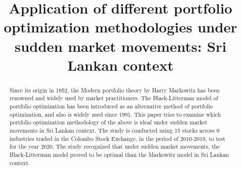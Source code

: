 \documentclass[conference]{IEEEtran}
\begin{document}
\title{Application of different portfolio optimization methodologies under sudden market movements: Sri Lankan context\\
}
\author{

\and
{}

\and
{}

\and
{}
}

\maketitle

\begin{abstract}

Since its origin in 1952, the Modern portfolio theory by Harry Markowitz has been renowned and widely used by market practitioners. The Black-Litterman model of portfolio optimization has been introduced as an alternative method of portfolio optimization, and also is widely used since 1991. This paper tries to examine which portfolio optimization methodology of the above is ideal under sudden market movements in Sri Lankan context. The study is conducted using 15 stocks across 9 industries traded in the Colombo Stock Exchange, in the period of 2010-2019, to test for the year 2020. The study recognized that under sudden market movements, the Black-Litterman model proved to be optimal than the Markowitz model in Sri Lankan context.

\end{abstract}
\end{document}
